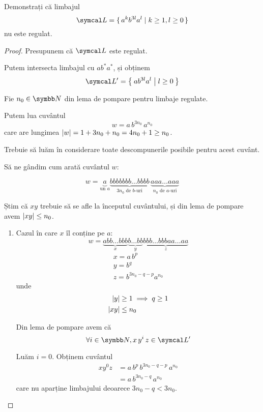 \begin{exercise}
    Demonstrați că limbajul
    \[\limbaj = \set{ a^k b^{3l} a^l | k \geq 1, l \geq 0 }\]
    nu este regulat.
\end{exercise}
\begin{proof}
    Presupunem că \(\limbaj\) este regulat.

    Putem intersecta limbajul cu \(a b^* a^*\), și obținem
    \[\limbaj' = \Set{ a b^{3l} a^l | l \geq 0 }\]

    Fie \(n_0 \in \naturals\) din lema de pompare pentru limbaje regulate.

    Putem lua cuvântul
    \[w = a \, b^{3 n_0} \, a^{n_0}\]
    care are lungimea \(\left\lvert w\right\rvert = 1 + 3 n_0 + n_0 = 4 n_0 + 1 \geq n_0\).

    Trebuie să luăm în considerare toate descompunerile posibile pentru acest cuvânt.

    Să ne gândim cum arată cuvântul \(w\):

    \[w = \underbrace{a}_{\text{un \(a\)}} \underbrace{bbbbbbb\dots{}bbbb}_{3n_0 \text{ de \(b\)-uri}} \, \underbrace{aaa\dots{}aaa}_{n_0 \text{ de \(a\)-uri}}\]

    Știm că \(xy\) trebuie să se afle la începutul cuvântului, și din lema de pompare avem \(\left\lvert xy\right\rvert \leq n_0\).

    \begin{enumerate}
        \item Cazul în care \(x\) îl conține pe \(a\):
              \[w = \underbrace{a bb\dots{}bbb}_{x} \underbrace{b\dots{}bb}_{y} \underbrace{bbb\dots{}bbb aa\dots{}aa}_{z}\]
              \begin{gather*}
                  x = a \, b^p \\
                  y = b^q \\
                  z = b^{3 n_0 - q - p} a^{n_0}
              \end{gather*}
              unde
              \begin{align*}
                  \left\lvert y\right\rvert   & \geq 1 \implies q \geq 1 \\
                  \left\lvert x y\right\rvert & \leq n_0
              \end{align*}

              Din lema de pompare avem că
              \[\forall i \in \naturals, x \, y^i \, z \in \limbaj'\]

              Luăm \(i = 0\). Obținem cuvântul
              \begin{align*}
                  x y^0 z & = a \, b^p \, b^{3 n_0 - q - p} \, a^{n_0} \\
                          & = a \, b^{3 n_0 - q} \, a^{n_0}
              \end{align*}
              care nu aparține limbajului deoarece \(3 n_0 - q < 3 n_0\).


\end{enumerate}
\end{proof}
